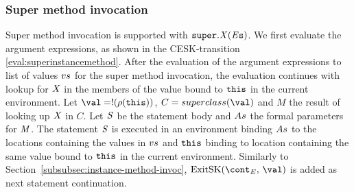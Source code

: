 \documentclass{article}
\begin{document}
\subsubsection{Super method invocation}
\label{subsubsec:super-method-invocation}
Super method invocation is supported with $\tt{super}.\mathit{X}(\mathit{E}{s})$.
We first evaluate the argument expressions, as shown in the CESK-transition \eqref{eval:superinstancemethod}.
After the evaluation of the argument expressions to list of values $vs$ for the super method invocation, the evaluation continues with lookup for $\mathit{X}$ in the members of the value bound to $\tt{this}$ in the current environment.
Let $\val = \deref{(\env(\this))}$, $C = \superclass{\val}$ and $M$ the result of looking up $\mathit{X}$ in $C$.
Let $\mathit{S}$ be the statement body and $As$ the formal parameters for $\mathit{M}$.
The statement $\mathit{S}$ is executed in an environment binding $As$ to the locations containing the values in $vs$ and $\tt{this}$ binding to location containing the same value bound to $\tt{this}$ in the current environment.
Similarly to Section~\ref{subsubsec:instance-method-invoc}, $\ExitSK{\val}$ is added as next statement continuation.
\end{document}
